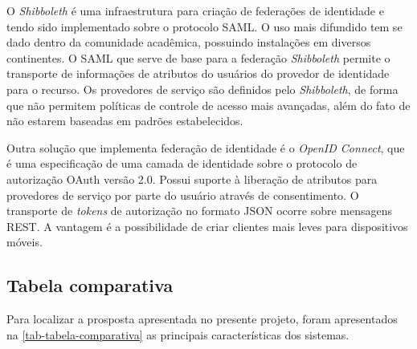 \documentclass{doublecol-new}
\begin{document}
O \textit{Shibboleth} é uma infraestrutura para criação de federações de identidade e tendo sido implementado sobre o protocolo SAML. O uso mais difundido tem se dado dentro da comunidade acadêmica, possuindo instalações em diversos continentes. O SAML que serve de base para a federação \textit{Shibboleth} permite o transporte de informações de atributos do usuários do provedor de identidade para o recurso. Os provedores de serviço são definidos pelo \textit{Shibboleth}, de forma que não permitem políticas de controle de acesso mais avançadas, além do fato de não estarem baseadas em padrões estabelecidos.

Outra solução que implementa federação de identidade é o \textit{OpenID Connect}, que é uma especificação de uma camada de identidade sobre o protocolo de autorização OAuth versão 2.0. Possui suporte à liberação de atributos para provedores de serviço por parte do usuário através de consentimento. O transporte de \textit{tokens} de autorização no formato JSON ocorre sobre mensagens REST. A vantagem é a possibilidade de criar clientes mais leves para dispositivos móveis.




\subsection{Tabela comparativa}

Para localizar a prosposta apresentada no presente projeto, foram apresentados na \ref{tab-tabela-comparativa} as principais características dos sistemas.
\end{document}
